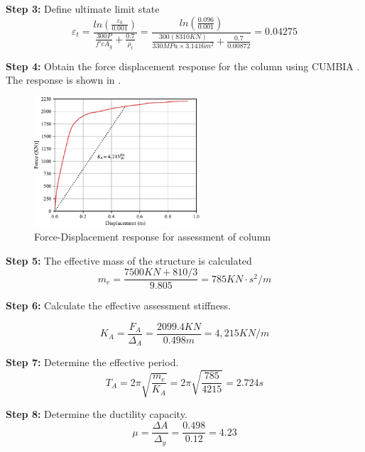 \textbf{Step 3:} Define ultimate limit state
\begin{displaymath}
    \varepsilon_{t}=\frac{ln(\frac{\varepsilon_{b}}{0.001})}{\frac{300P}{f'c A_{g}}+\frac{0.7}{\rho_{t}}}=\frac{ln(\frac{0.096}{0.001})}{\frac{300(8310KN)}{330MPa \times 3.1416 m^2}+\frac{0.7}{0.00872}}=0.04275
\end{displaymath}

\textbf{Step 4:} Obtain the force displacement response for the column using CUMBIA \cite{Montejo2007}. The response is shown in .

\begin{figure}[htbp]
	\centering
	\includegraphics[width=0.55\textwidth]{VAC Thesis 2.0/Chapter-6/figs/Force_Displacement_Assessment_9_75.pdf}
	\caption{Force-Displacement response for assessment of column}
	\label{fig:force_displacement_assessment}
\end{figure}

\textbf{Step 5:} The effective mass of the structure is calculated
\begin{displaymath}
    m_e=\frac{7500 KN + 810/3}{9.805}=785 KN \cdot s^2/m
\end{displaymath}

\textbf{Step 6:} Calculate the effective assessment stiffness.

\begin{displaymath}
    K_{A}=\frac{F_{A}}{\Delta_{A}}=\frac{2099.4 KN}{0.498 m}=4,215 KN/m
\end{displaymath}

\textbf{Step 7:} Determine the effective period.
\begin{displaymath}
    T_{A}=2\pi \sqrt{\frac{m_e}{K_A}}=2\pi \sqrt{\frac{785}{4215}}=2.724 s
\end{displaymath}

\textbf{Step 8:} Determine the ductility capacity.
\begin{displaymath}
    \mu = \frac{\Delta{A}}{\Delta_{y}} = \frac{0.498}{0.12} = 4.23
\end{displaymath}

